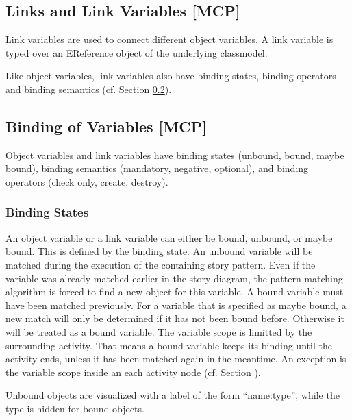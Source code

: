 \subsection{Links and Link Variables [MCP]}
\label{sec:StoryPatterns:links}

Link variables are used to connect different object variables. 
A link variable is typed over an EReference object of the underlying
classmodel.

Like object variables, link variables also have binding states, binding
operators and binding semantics (cf. Section \ref{sec:StoryPatterns:binding}).



\subsection{Binding of Variables [MCP]}
\label{sec:StoryPatterns:binding}

Object variables and link variables have binding states (unbound, bound, maybe
bound), binding semantics (mandatory, negative, optional), and binding operators
(check only, create, destroy).


\subsubsection{Binding States}
\label{sec:StoryPatterns:binding:states}
An object variable or a link variable can either be bound, unbound, or maybe
bound. This is defined by the binding state. 
An unbound variable will be matched during the execution of the containing story
pattern. 
Even if the variable was already matched earlier in the story diagram, the
pattern matching algorithm is forced to find a new object for this variable.
A bound variable must have been matched previously. 
For a variable that is specified as maybe bound, a new match will only be
determined if it has not been bound before. 
Otherwise it will be treated as a bound variable.
The variable scope is limitted by the surrounding activity. 
That means a bound variable keeps its binding until the activity ends, unless
it has been matched again in the meantime.
An exception is the variable scope inside an each activity node (cf. Section
\label{sec:StoryDiagrams}).

Unbound objects are visualized with a label of the form ``name:type'', while
the type is hidden for bound objects.

